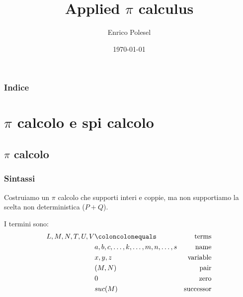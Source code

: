 \documentclass{beamer}
\theoremstyle{plain}
\theoremstyle{definition}
\theoremstyle{remark}
\begin{document}
\title{Applied $\pi$ calculus}
\date{\today}

\author{Enrico Polesel}



\begin{frame}[plain]
  \titlepage
\end{frame}

\begin{frame}[plain]
 \frametitle{Indice}
 \tableofcontents
\end{frame}




\AtBeginSubsection[]
{
  \begin{frame}[plain]{\secname $\rightarrow$ \subsecname}
    \tableofcontents[currentsubsection]
  \end{frame}
}

\section{$\pi$ calcolo e spi calcolo}

\subsection{$\pi$ calcolo}

\begin{frame}
  \frametitle{Sintassi}
  Costruiamo un $\pi$ calcolo che supporti interi e coppie, ma non
  supportiamo la scelta non deterministica ($P+Q$).

  I termini sono:
  \begin{align*}
    L,M,N,T,U,V & \coloncolonequals & \text{terms} \\
                & a,b,c,\dots,k,\dots,m,n,\dots,s & \text{name} \\
                & x,y,z & \text{variable} \\
                & (M,N) & \text{pair} \\
                & 0 & \text{zero} \\
                & suc(M) & \text{successor}
  \end{align*}
\end{frame}
\end{document}
